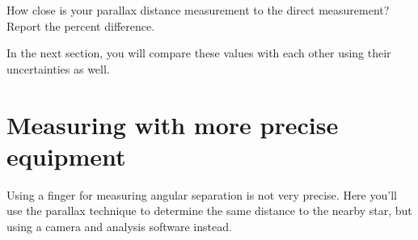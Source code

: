 \begin{steps}	
	\item How close is your parallax distance measurement to the direct measurement? Report the percent difference.
\end{steps}

In the next section, you will compare these values with each other using their uncertainties as well.


\section{Measuring with more precise equipment}

Using a finger for measuring angular separation is not very precise. Here you'll use the parallax technique to determine the same distance to the nearby star, but using a camera and analysis software instead.

